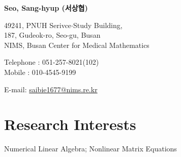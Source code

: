 \documentclass[11pt]{article} %
\begin{document}
\newpage\setcounter{page}{1}
{\LARGE\bfseries Seo, Sang-hyup (서상협)} %
\bigskip\bigskip\medskip %

49241, PNUH Serivce$\cdot$Study Building,\\ %
187, Gudeok-ro, Seo-gu, Busan\\
NIMS, Busan Center for Medical Mathematics
\medskip %

Telephone : 051-257-8021(102)\\ %
Mobile : 010-4545-9199 %
\medskip %

E-mail: \href{mailto:saibie1677@nims.re.kr}{saibie1677@nims.re.kr}\\ %





%


\section*{Research Interests}

Numerical Linear Algebra; Nonlinear Matrix Equations %


%
\end{document}
